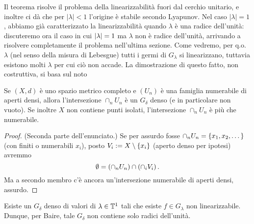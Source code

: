 Il teorema risolve il problema della linearizzabilità fuori dal cerchio unitario, e inoltre ci dà che per $|\lambda|<1$ l'origine è stabile secondo Lyapunov. Nel caso $|\lambda|=1$,
abbiamo già caratterizzato la linearizzabilità quando $\lambda$ è una radice dell'unità: discuteremo ora il caso in cui $\left|\lambda\right|=1$ ma $\lambda$ non è radice dell'unità, arrivando a risolvere completamente il problema nell'ultima sezione. Come vedremo, per q.o. $\lambda$ (nel senso della misura di Lebesgue) tutti i germi di $G_\lambda$ si linearizzano, tuttavia esistono molti $\lambda$ per cui ciò non accade. La dimostrazione di questo fatto, non costruttiva, si basa sul noto

\begin{teo}Se $(X,d)$ è uno spazio metrico completo e $(U_n)$ è una famiglia numerabile di aperti densi,
allora l'intersezione $\cap_n U_n$ è un $G_\delta$ denso (e in particolare non vuoto). Se inoltre $X$ non contiene punti isolati, l'intersezione $\cap_n U_n$ è più che numerabile.
\end{teo}

\begin{proof} (Seconda parte dell'enunciato.) Se per assurdo fosse $\cap_n U_n=\left\{x_1,x_2,\dots\right\}$ (con finiti o numerabili $x_i$),
posto $V_i:=X\setminus\left\{x_i\right\}$ (aperto denso per ipotesi) avremmo
\[ \emptyset=\left(\cap_n U_n\right)\cap\left(\cap_i V_i\right). \]
Ma a secondo membro c'è ancora un'intersezione numerabile di aperti densi, assurdo.
\end{proof}

\begin{teo} Esiste un $G_\delta$ denso di valori di $\lambda\in\mathbb{T}^1$ tali che esiste $f\in G_\lambda$ non linearizzabile. Dunque, per Baire, tale $G_\delta$ non contiene solo radici dell'unità.\end{teo}


